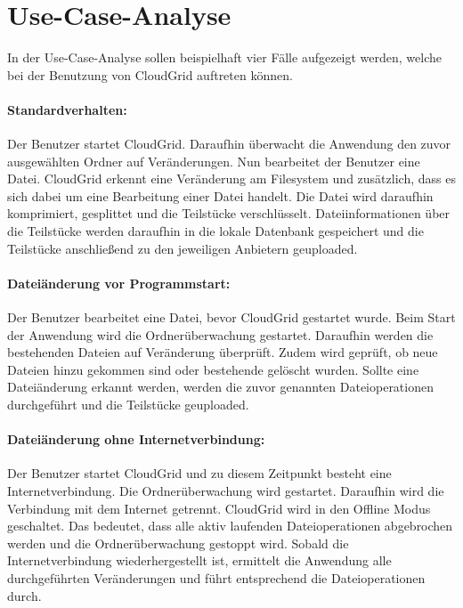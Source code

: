 \section{Use-Case-Analyse}
\label{anforderungusecase}
In der Use-Case-Analyse sollen beispielhaft vier Fälle aufgezeigt werden, welche bei der Benutzung von CloudGrid auftreten können.

\paragraph{Standardverhalten:}
Der Benutzer startet CloudGrid.
Daraufhin überwacht die Anwendung den zuvor ausgewählten Ordner auf Veränderungen.
Nun bearbeitet der Benutzer eine Datei.
CloudGrid erkennt eine Veränderung am Filesystem und zusätzlich, dass es sich dabei um eine Bearbeitung einer Datei handelt.
Die Datei wird daraufhin komprimiert, gesplittet und die Teilstücke verschlüsselt.
Dateiinformationen über die Teilstücke werden daraufhin in die lokale Datenbank gespeichert und die Teilstücke anschließend zu den jeweiligen Anbietern geuploaded.

\paragraph{Dateiänderung vor Programmstart:}
Der Benutzer bearbeitet eine Datei, bevor CloudGrid gestartet wurde.
Beim Start der Anwendung wird die Ordnerüberwachung gestartet.
Daraufhin werden die bestehenden Dateien auf Veränderung überprüft.
Zudem wird geprüft, ob neue Dateien hinzu gekommen sind oder bestehende gelöscht wurden.
Sollte eine Dateiänderung erkannt werden, werden die zuvor genannten Dateioperationen durchgeführt und die Teilstücke geuploaded.

\paragraph{Dateiänderung ohne Internetverbindung:}
Der Benutzer startet CloudGrid und zu diesem Zeitpunkt besteht eine Internetverbindung.
Die Ordnerüberwachung wird gestartet.
Daraufhin wird die Verbindung mit dem Internet getrennt.
CloudGrid wird in den Offline Modus geschaltet.
Das bedeutet, dass alle aktiv laufenden Dateioperationen abgebrochen werden und die Ordnerüberwachung gestoppt wird.
Sobald die Internetverbindung wiederhergestellt ist, ermittelt die Anwendung alle durchgeführten Veränderungen und führt entsprechend die Dateioperationen durch.

